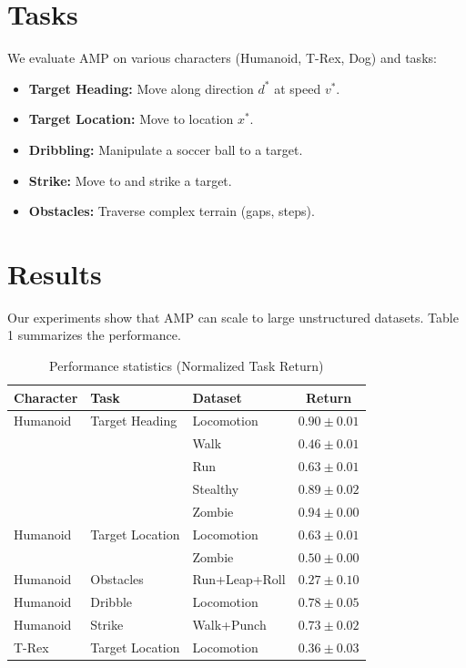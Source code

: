 \documentclass[acmtog]{acmart}
\begin{document}
\section{Tasks}
We evaluate AMP on various characters (Humanoid, T-Rex, Dog) and tasks:
\begin{itemize}
    \item \textbf{Target Heading:} Move along direction $d^*$ at speed $v^*$.
    \item \textbf{Target Location:} Move to location $x^*$.
    \item \textbf{Dribbling:} Manipulate a soccer ball to a target.
    \item \textbf{Strike:} Move to and strike a target.
    \item \textbf{Obstacles:} Traverse complex terrain (gaps, steps).
\end{itemize}

\section{Results}
Our experiments show that AMP can scale to large unstructured datasets. Table 1 summarizes the performance.

\begin{table}[h]
\caption{Performance statistics (Normalized Task Return)}
\label{tab:performance}
\begin{tabular}{lllc}
\toprule
Character & Task & Dataset & Return \\
\midrule
Humanoid & Target Heading & Locomotion & $0.90 \pm 0.01$ \\
         &                & Walk & $0.46 \pm 0.01$ \\
         &                & Run & $0.63 \pm 0.01$ \\
         &                & Stealthy & $0.89 \pm 0.02$ \\
         &                & Zombie & $0.94 \pm 0.00$ \\
Humanoid & Target Location& Locomotion & $0.63 \pm 0.01$ \\
         &                & Zombie & $0.50 \pm 0.00$ \\
Humanoid & Obstacles      & Run+Leap+Roll & $0.27 \pm 0.10$ \\
Humanoid & Dribble        & Locomotion & $0.78 \pm 0.05$ \\
Humanoid & Strike         & Walk+Punch & $0.73 \pm 0.02$ \\
T-Rex    & Target Location& Locomotion & $0.36 \pm 0.03$ \\
\bottomrule
\end{tabular}
\end{table}
\end{document}
